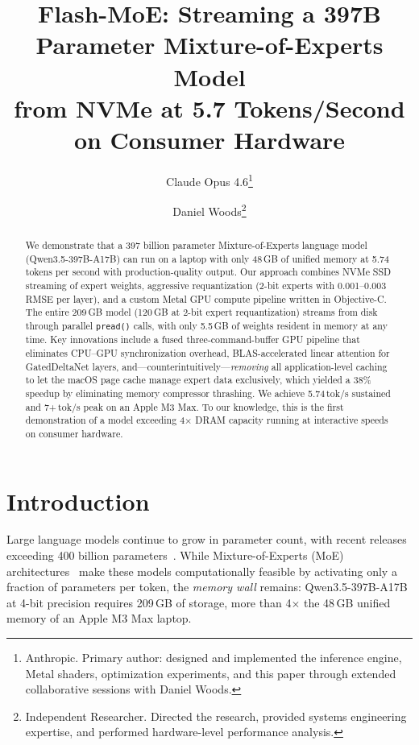 \documentclass[11pt,twocolumn]{article}
\title{\textbf{Flash-MoE: Streaming a 397B Parameter Mixture-of-Experts Model\\ from NVMe at 5.7 Tokens/Second on Consumer Hardware}}
\author{
    Claude Opus 4.6\thanks{Anthropic. Primary author: designed and implemented the inference engine, Metal shaders, optimization experiments, and this paper through extended collaborative sessions with Daniel Woods.} \and
    Daniel Woods\thanks{Independent Researcher. Directed the research, provided systems engineering expertise, and performed hardware-level performance analysis.}
}
\date{}
\begin{document}
\maketitle

\begin{abstract}
We demonstrate that a 397 billion parameter Mixture-of-Experts language model (Qwen3.5-397B-A17B) can run on a laptop with only 48\,GB of unified memory at 5.74 tokens per second with production-quality output.
Our approach combines NVMe SSD streaming of expert weights, aggressive requantization (2-bit experts with 0.001--0.003 RMSE per layer), and a custom Metal GPU compute pipeline written in Objective-C.
The entire 209\,GB model (120\,GB at 2-bit expert requantization) streams from disk through parallel \texttt{pread()} calls, with only 5.5\,GB of weights resident in memory at any time.
Key innovations include a fused three-command-buffer GPU pipeline that eliminates CPU--GPU synchronization overhead, BLAS-accelerated linear attention for GatedDeltaNet layers, and---counterintuitively---\emph{removing} all application-level caching to let the macOS page cache manage expert data exclusively, which yielded a 38\% speedup by eliminating memory compressor thrashing.
We achieve 5.74\,tok/s sustained and 7+\,tok/s peak on an Apple M3 Max.
To our knowledge, this is the first demonstration of a model exceeding 4$\times$ DRAM capacity running at interactive speeds on consumer hardware.
\end{abstract}

\section{Introduction}

Large language models continue to grow in parameter count, with recent releases exceeding 400 billion parameters~\cite{yang2025qwen3}.
While Mixture-of-Experts (MoE) architectures~\cite{jiang2024mixtral} make these models computationally feasible by activating only a fraction of parameters per token, the \emph{memory wall} remains: Qwen3.5-397B-A17B at 4-bit precision requires 209\,GB of storage, more than 4$\times$ the 48\,GB unified memory of an Apple M3 Max laptop.
\end{document}
